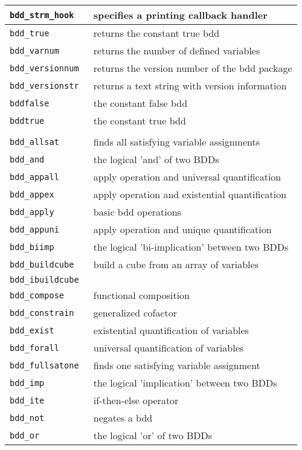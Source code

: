 \begin{supertabular}{|l|l|}
{\tt bdd\_strm\_hook } & specifies a printing callback handler  \\\hline
{\tt bdd\_true } & returns the constant true bdd  \\\hline
{\tt bdd\_varnum } & returns the number of defined variables  \\\hline
{\tt bdd\_versionnum } & returns the version number of the bdd package  \\\hline
{\tt bdd\_versionstr } & returns a text string with version information  \\\hline
{\tt bddfalse} & the constant false bdd  \\\hline
{\tt bddtrue } & the constant true bdd  \\\hline
{} \\ \hline
{\tt bdd\_allsat } & finds all satisfying variable assignments  \\\hline
{\tt bdd\_and } & the logical 'and' of two BDDs  \\\hline
{\tt bdd\_appall } & apply operation and universal quantification  \\\hline
{\tt bdd\_appex } & apply operation and existential quantification  \\\hline
{\tt bdd\_apply } & basic bdd operations  \\\hline
{\tt bdd\_appuni } & apply operation and unique quantification  \\\hline
{\tt bdd\_biimp } & the logical 'bi-implication' between two BDDs  \\\hline
{\tt bdd\_buildcube } & build a cube from an array of variables  \\
{\tt bdd\_ibuildcube } & \\\hline
{\tt bdd\_compose } & functional composition  \\\hline
{\tt bdd\_constrain } & generalized cofactor  \\\hline
{\tt bdd\_exist } & existential quantification of variables  \\\hline
{\tt bdd\_forall } & universal quantification of variables  \\\hline
{\tt bdd\_fullsatone } & finds one satisfying variable assignment  \\\hline
{\tt bdd\_imp } & the logical 'implication' between two BDDs  \\\hline
{\tt bdd\_ite } & if-then-else operator  \\\hline
{\tt bdd\_not } & negates a bdd  \\\hline
{\tt bdd\_or } & the logical 'or' of two BDDs  \\\hline

\end{supertabular}
